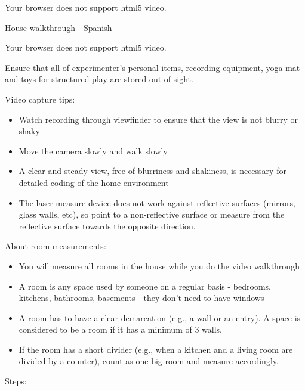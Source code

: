 \documentclass[
  12pt,
]{book}
\providecommand{\tightlist}{%
  \setlength{\itemsep}{0pt}\setlength{\parskip}{0pt}}
\begin{document}
Your browser does not support html5 video.

House walkthrough - Spanish

Your browser does not support html5 video.

Ensure that all of experimenter's personal items, recording equipment, yoga mat and toys for structured play are stored out of sight.

Video capture tips:

\begin{itemize}
\tightlist
\item
  Watch recording through viewfinder to ensure that the view is not blurry or shaky\\
\item
  Move the camera slowly and walk slowly\\
\item
  A clear and steady view, free of blurriness and shakiness, is necessary for detailed coding of the home environment
\item
  The laser measure device does not work against reflective surfaces (mirrors, glass walls, etc), so point to a non-reflective surface or measure from the reflective surface towards the opposite direction.
\end{itemize}

About room measurements:

\begin{itemize}
\tightlist
\item
  You will measure all rooms in the house while you do the video walkthrough\\
\item
  A room is any space used by someone on a regular basis - bedrooms, kitchens, bathrooms, basements - they don't need to have windows\\
\item
  A room has to have a clear demarcation (e.g., a wall or an entry). A space is considered to be a room if it has a minimum of 3 walls.
\item
  If the room has a short divider (e.g., when a kitchen and a living room are divided by a counter), count as one big room and measure accordingly.
\end{itemize}

Steps:
\end{document}

